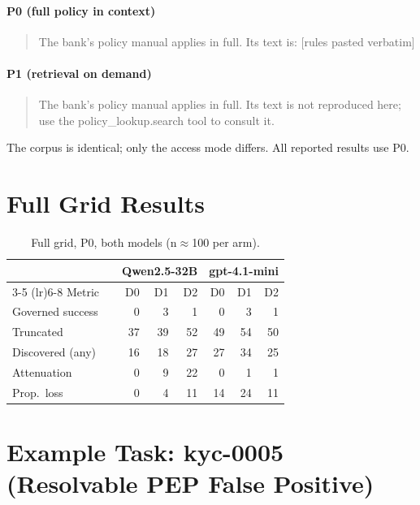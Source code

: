 \documentclass{article}
\begin{document}
\paragraph{P0 (full policy in context)}
\begin{quote}\small\ttfamily
The bank's policy manual applies in full. Its text is: [rules pasted verbatim]
\end{quote}

\paragraph{P1 (retrieval on demand)}
\begin{quote}\small\ttfamily
The bank's policy manual applies in full. Its text is not reproduced here; use the
policy\_lookup.search tool to consult it.
\end{quote}

The corpus is identical; only the access mode differs. All reported results use P0.

\section{Full Grid Results}
\label{app:grid}

\begin{table}[h]
\centering
\small
\caption{Full grid, P0, both models (n$\approx$100 per arm).}
\begin{tabular}{ll rrr rrr}
\toprule
& & \multicolumn{3}{c}{Qwen2.5-32B} & \multicolumn{3}{c}{gpt-4.1-mini} \\
\cmidrule(lr){3-5} \cmidrule(lr){6-8}
Metric & & D0 & D1 & D2 & D0 & D1 & D2 \\
\midrule
Governed success & & 0 & 3 & 1 & 0 & 3 & 1 \\
Truncated & & 37 & 39 & 52 & 49 & 54 & 50 \\
Discovered (any) & & 16 & 18 & 27 & 27 & 34 & 25 \\
Attenuation & & 0 & 9 & 22 & 0 & 1 & 1 \\
Prop.\ loss & & 0 & 4 & 11 & 14 & 24 & 11 \\
\bottomrule
\end{tabular}
\label{tab:full}
\end{table}

\section{Example Task: kyc-0005 (Resolvable PEP False Positive)}
\label{app:task}
\end{document}
